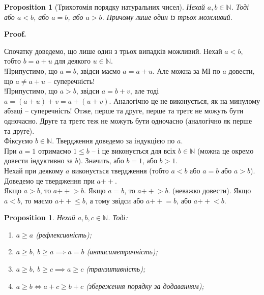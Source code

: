 \documentclass[a4paper, 14pt]{extarticle}
\makeatletter
\theoremstyle{theoremdd}
\theoremstyle{theoremdd}
\theoremstyle{theoremdd}
\theoremstyle{theoremdd}
\theoremstyle{theoremdd}
\theoremstyle{theoremdd}
\theoremstyle{theoremdd}
\theoremstyle{theoremdd}
\theoremstyle{theoremdd}
\theoremstyle{theoremdd}
\newtheorem{proposition}[theorem]{Proposition}
\theoremstyle{theoremdd}
\theoremstyle{theoremdd}
\theoremstyle{theoremdd}
\theoremstyle{theoremdd}
\theoremstyle{theoremdd}
\theoremstyle{theoremdd}
\renewenvironment{proof}[1][Proof.\\]{\par
\pushQED{\hfill \qed}%
\normalfont \topsep6\p@\@plus6\p@\relax
\trivlist
\item\relax
{\bfseries
#1\@addpunct{.}}\hspace\labelsep\ignorespaces
}{%
\popQED\endtrivlist\@endpefalse
}
\newcommand{\plusplus}{\!\!\mathrel{++}}
\makeatother
\begin{document}
\begin{proposition}[Трихотомія порядку натуральних чисел]
Нехай $a,b \in \mathbb{N}$. Тоді або $a < b$, або $a = b$, або $a > b$. Причому лише один із трьох можливий.
\end{proposition}

\begin{proof}
Спочатку доведемо, що лише один з трьох випадків можливий. Нехай $a < b$, тобто $b = a + u$ для деякого $u \in \mathbb{N}$.\\
!Припустимо, що $a = b$, звідси маємо $a = a + u$. Але можна за МІ по $a$ довести, що $a \neq a + u$ -- суперечність!\\
!Припустимо, що $a > b$, звідси $a = b + v$, але тоді $a = (a + u) +v = a + (u+v)$. Аналогічно це не виконується, як на минулому абзаці -- суперечність!
Отже, перше та друге, перше та третє не можуть бути одночасно. Друге та третє теж не можуть бути одночасно (аналогічно як перше та друге).
\bigskip \\
Фіксуємо $b \in \mathbb{N}$. Твердження доведемо за індукцією по $a$.\\
При $a = 1$ отримаємо $1 \leq b$ -- і це виконується для всіх $b \in \mathbb{N}$ (можна це окремо довести індуктивно за $b$). Значить, або $b = 1$, або $b > 1$.\\
Нехай при деякому $a$ виконується твердження (тобто $a < b$ або $a = b$ або $a > b$). Доведемо це твердження при $a \plusplus$.\\
Якщо $a > b$, то $a\plusplus > b$. Якщо $a = b$, то $a \plusplus > b$. (неважко довести). Якщо $a < b$, то маємо $a \plusplus \leq b$, а тому звідси або $a \plusplus = b$, або $a \plusplus < b$.
\end{proof}

\begin{proposition}
Нехай $a,b,c \in \mathbb{N}$. Тоді:
\begin{enumerate}[nosep,wide=0pt,label={\arabic*)}]
\item $a \geq a$ (рефлексивність);
\item $a \geq b,\ b \geq a \implies a = b$ (антисиметричність);
\item $a \geq b,\ b \geq c \implies a \geq c$ (транзитивність);
\item $a \geq b \iff a + c \geq b + c$ (збереження порядку за додаванням);
\end{enumerate}
\end{proposition}
\end{document}
